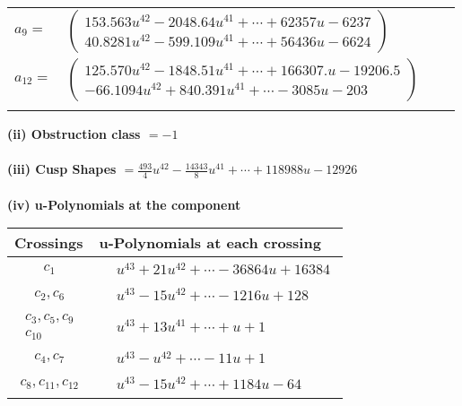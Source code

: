 \documentclass[1p]{elsarticle_modified}
\theoremstyle{definition}
\begin{document}
\begin{tabular}{m{7pt} m{180pt} m{7pt} m{180pt} }
\flushright $a_{9}=$&$\begin{pmatrix}153.563 u^{42}-2048.64 u^{41}+\cdots+62357 u-6237\\40.8281 u^{42}-599.109 u^{41}+\cdots+56436 u-6624\end{pmatrix}$ \\
\flushright $a_{12}=$&$\begin{pmatrix}125.570 u^{42}-1848.51 u^{41}+\cdots+166307. u-19206.5\\-66.1094 u^{42}+840.391 u^{41}+\cdots-3085 u-203\end{pmatrix}$\\&\end{tabular}
\flushleft \textbf{(ii) Obstruction class $= -1$}\\~\\
\flushleft \textbf{(iii) Cusp Shapes $= \frac{493}{4} u^{42}-\frac{14343}{8} u^{41}+\cdots+118988 u-12926$}\\~\\
\newpage\renewcommand{\arraystretch}{1}
\flushleft \textbf{(iv) u-Polynomials at the component}\newline \\
\begin{tabular}{m{50pt}|m{274pt}}
Crossings & \hspace{64pt}u-Polynomials at each crossing \\
\hline $$\begin{aligned}c_{1}\end{aligned}$$&$\begin{aligned}
&u^{43}+21 u^{42}+\cdots-36864 u+16384
\end{aligned}$\\
\hline $$\begin{aligned}c_{2},c_{6}\end{aligned}$$&$\begin{aligned}
&u^{43}-15 u^{42}+\cdots-1216 u+128
\end{aligned}$\\
\hline $$\begin{aligned}c_{3},c_{5},c_{9}\\c_{10}\end{aligned}$$&$\begin{aligned}
&u^{43}+13 u^{41}+\cdots+u+1
\end{aligned}$\\
\hline $$\begin{aligned}c_{4},c_{7}\end{aligned}$$&$\begin{aligned}
&u^{43}- u^{42}+\cdots-11 u+1
\end{aligned}$\\
\hline $$\begin{aligned}c_{8},c_{11},c_{12}\end{aligned}$$&$\begin{aligned}
&u^{43}-15 u^{42}+\cdots+1184 u-64
\end{aligned}$\\
\hline
\end{tabular}\\~\\
\end{document}
